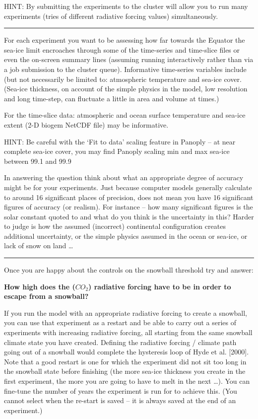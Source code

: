 \documentclass[11pt,fleqn]{book} %
\begin{document}
HINT: By submitting the experiments to the cluster will allow you to run many experiments (tries of different radiative forcing values) simultaneously.

\hfill \break
\noindent\rule{4cm}{0.1mm}
\hfill \break

For each experiment you want to be assessing how far towards the Equator the sea-ice limit encroaches through some of the time-series and time-slice files or even the on-screen summary lines (assuming running interactively rather than via a job submission to the cluster queue). Informative time-series variables include (but not necessarily be limited to: atmospheric temperature and sea-ice cover. (Sea-ice thickness, on account of the simple physics in the model, low resolution and long time-step, can fluctuate a little in area and volume at times.)

For the time-slice data: atmospheric and ocean surface temperature and sea-ice extent (2-D biogem NetCDF file) may be informative.

HINT: Be careful with the ‘Fit to data’ scaling feature in Panoply – at near complete sea-ice cover, you may find Panoply scaling min and max sea-ice between 99.1 and 99.9%

In answering the question think about what an appropriate degree of accuracy might be for your experiments. Just because computer models generally calculate to around 16 significant places of precision, does not mean you have 16 significant figures of accuracy (or realism). For instance – how many significant figures is the solar constant quoted to and what do you think is the uncertainty in this? Harder to judge is how the assumed (incorrect) continental configuration creates additional uncertainty, or the simple physics assumed in the ocean or sea-ice, or lack of snow on land … 

\hfill \break
\noindent\rule{4cm}{0.1mm}
\hfill \break

\noindent Once you are happy about the controls on the snowball threshold try and answer:

\noindent \textbf{How high does the (\(CO_{2}\)) radiative forcing have to be in order to escape from a snowball?}

If you run the model with an appropriate radiative forcing to create a snowball, you can use that experiment as a restart and be able to carry out a series of experiments with increasing radiative forcing, all starting from the same snowball climate state you have created. Defining the radiative forcing / climate path going out of a snowball would complete the hysteresis loop of Hyde et al. [2000]. Note that a good restart is one for which the experiment did not sit too long in the snowball state before finishing (the more sea-ice thickness you create in the first experiment, the more you are going to have to melt in the next …). You can fine-tune the number of years the experiment is run for to achieve this. (You cannot select when the re-start is saved – it is always saved at the end of an experiment.)
\end{document}
